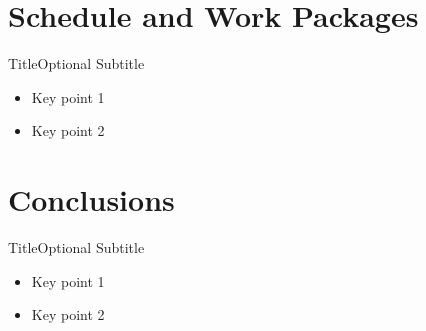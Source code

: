 \documentclass[11pt]{beamer}
\begin{document}
	\section{Schedule and Work Packages}
	
	\begin{frame}{Title}{Optional Subtitle}
		\begin{itemize}
			\item Key point 1
			\item Key point 2
		\end{itemize}
	\end{frame}
	
	\section{Conclusions}
	
	\begin{frame}{Title}{Optional Subtitle}
		\begin{itemize}
			\item Key point 1
			\item Key point 2
		\end{itemize}
	\end{frame}
\end{document}

